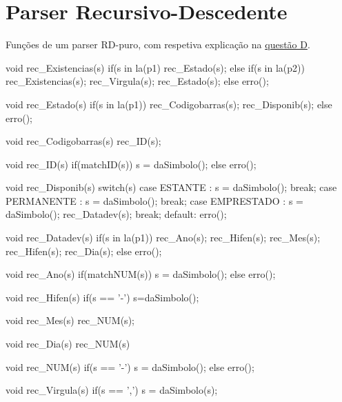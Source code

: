 \section{Parser Recursivo-Descedente} %
\label{sec:parser_recursivo_descedente}

Funções de um parser RD-puro, com respetiva explicação na \hyperref[sub:alinea_d]{questão D}.

\begin{spverbatim}
void rec_Existencias(s){
	if(s in la(p1){
		rec_Estado(s);
	}else if(s in la(p2)){
		rec_Existencias(s);
		rec_Virgula(s);
		rec_Estado(s);
	}else{
		erro();
	}
}

void rec_Estado(s){
	if(s in la(p1)){
		rec_Codigobarras(s);
		rec_Disponib(s);
	}else{
		erro();
	}
}

void rec_Codigobarras(s){
	rec_ID(s);
}

void rec_ID(s){
	if(matchID(s)){
		s = daSimbolo();
	}else{
		erro();
	}
}

void rec_Disponib(s){
	switch(s){
		case ESTANTE :
			s = daSimbolo();
			break;
		case PERMANENTE :
			s = daSimbolo();
			break;
		case EMPRESTADO :
			s = daSimbolo();
			rec_Datadev(s);
			break;
		default:
			erro();
	}
}

void rec_Datadev(s){
	if(s in la(p1)){
		rec_Ano(s);
		rec_Hifen(s);
		rec_Mes(s);
		rec_Hifen(s);
		rec_Dia(s);
	}else{
		erro();
	}
}

void rec_Ano(s){
	if(matchNUM(s)){
		s = daSimbolo();
	}else{
		erro();
	}
}

void rec_Hifen(s){
	if(s == '-'){
		s=daSimbolo();
	}
}

void rec_Mes(s){
	rec_NUM(s);
}

void rec_Dia(s){
	rec_NUM(s)
}


void rec_NUM(s){
	if(s == '-'){
		s = daSimbolo();
	}else{
		erro();
	}
}

void rec_Virgula(s){
	if(s == ','){
		s = daSimbolo(s);
	}
}

\end{spverbatim}
